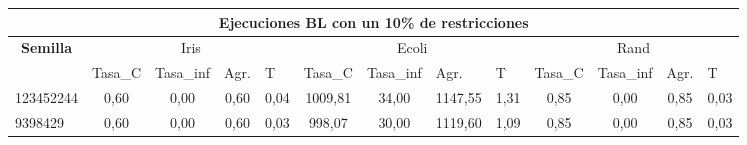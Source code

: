 \documentclass[12pt, spanish]{article}
\begin{document}
\begin{table}[H]
\small

\begin{adjustwidth}{-1cm}{-1cm}%

\begin{tabular}{|l|c|c|c|c|c|c|c|c|c|c|c|c|}
\hline
\multicolumn{13}{|c|}{\textbf{Ejecuciones BL con un 10\% de restricciones}}                                                                                                                                                                                                                                                                                                                                            \\ \hline
\multicolumn{1}{|c|}{\multirow{2}{*}{\textbf{Semilla}}} & \multicolumn{4}{c|}{Iris}                                                                                          & \multicolumn{4}{c|}{Ecoli}                                                                                         & \multicolumn{4}{c|}{Rand}                                                                                          \\ \cline{2-13} 
\multicolumn{1}{|c|}{}                                  & \multicolumn{1}{l|}{Tasa\_C} & \multicolumn{1}{l|}{Tasa\_inf} & \multicolumn{1}{l|}{Agr.} & \multicolumn{1}{l|}{T} & \multicolumn{1}{l|}{Tasa\_C} & \multicolumn{1}{l|}{Tasa\_inf} & \multicolumn{1}{l|}{Agr.} & \multicolumn{1}{l|}{T} & \multicolumn{1}{l|}{Tasa\_C} & \multicolumn{1}{l|}{Tasa\_inf} & \multicolumn{1}{l|}{Agr.} & \multicolumn{1}{l|}{T} \\ \hline
123452244                                               & 0,60                         & 0,00                           & 0,60                      & 0,04                   & 1009,81                      & 34,00                          & 1147,55                   & 1,31                   & 0,85                         & 0,00                           & 0,85                      & 0,03                   \\ \hline
9398429                                                 & 0,60                         & 0,00                           & 0,60                      & 0,03                   & 998,07                       & 30,00                          & 1119,60                   & 1,09                   & 0,85                         & 0,00                           & 0,85                      & 0,03                   \\ \hline

\end{tabular}
\end{adjustwidth}
\end{table}
\end{document}
